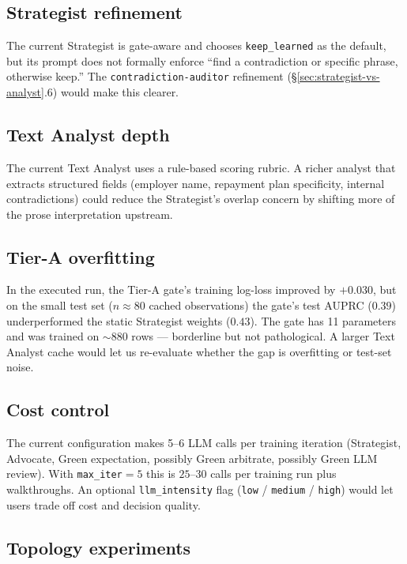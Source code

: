 \documentclass[11pt,a4paper]{article}
\begin{document}
\subsection{Strategist refinement}

The current Strategist is gate-aware and chooses \texttt{keep\_learned} as
the default, but its prompt does not formally enforce ``find a contradiction
or specific phrase, otherwise keep.'' The \texttt{contradiction-auditor}
refinement (\S\ref{sec:strategist-vs-analyst}.6) would make this clearer.

\subsection{Text Analyst depth}

The current Text Analyst uses a rule-based scoring rubric. A richer analyst
that extracts structured fields (employer name, repayment plan specificity,
internal contradictions) could reduce the Strategist's overlap concern by
shifting more of the prose interpretation upstream.

\subsection{Tier-A overfitting}

In the executed run, the Tier-A gate's training log-loss improved by
$+0.030$, but on the small test set ($n \approx 80$ cached observations)
the gate's test AUPRC ($0.39$) underperformed the static Strategist
weights ($0.43$). The gate has 11 parameters and was trained on
$\sim 880$ rows --- borderline but not pathological. A larger Text
Analyst cache would let us re-evaluate whether the gap is overfitting
or test-set noise.

\subsection{Cost control}

The current configuration makes 5--6 LLM calls per training iteration
(Strategist, Advocate, Green expectation, possibly Green arbitrate,
possibly Green LLM review). With \texttt{max\_iter}$=5$ this is
$25$--$30$ calls per training run plus walkthroughs. An optional
\texttt{llm\_intensity} flag (\texttt{low} / \texttt{medium} / \texttt{high})
would let users trade off cost and decision quality.

\subsection{Topology experiments}
\end{document}

